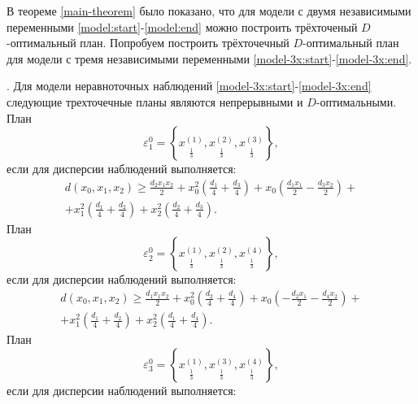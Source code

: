 В теореме \ref{main-theorem} было показано, что для модели с двумя независимыми переменными \eqref{model:start}-\eqref{model:end} можно построить трёхточеный $D$-оптимальный план.  
Попробуем построить трёхточечный $D$-оптимальный план для модели с тремя независимыми переменными  \eqref{model-3x:start}-\eqref{model-3x:end}.
\begin{theorem}.\label{theorem:model-3x-D-opt}
	Для модели неравноточных наблюдений \eqref{model-3x:start}-\eqref{model-3x:end} следующие трехточечные планы являются непрерывными и $D$-оптимальными.\\
	План 
	\begin{equation} \label{theorem:model-3x-D-opt:plan-1}
	\varepsilon_1^{0} = \left \{ 
	\underset{\frac 1 3} {x^{(1)}},
	\underset{\frac 1 3} {x^{(2)}},
	\underset{\frac 1 3} {x^{(3)}}
	\right \},
	\end{equation}
	если для дисперсии наблюдений выполняется:
	\begin{multline}\label{theorem:model-3x-D-opt:plan-1-d}
	d(x_0, x_1, x_2) \ge \frac{d_{2} x_{1} x_{2}}{2} + x_{0}^{2} \left(\frac{d_{1}}{4} + \frac{d_{3}}{4}\right) + x_{0} \left(\frac{d_{1} x_{1}}{2} - \frac{d_{3} x_{2}}{2}\right) + \\ + x_{1}^{2} \left(\frac{d_{1}}{4} + \frac{d_{2}}{4}\right) + x_{2}^{2} \left(\frac{d_{2}}{4} + \frac{d_{3}}{4}\right).
	\end{multline}
	План 
	\begin{equation} \label{theorem:model-3x-D-opt:plan-2}
	\varepsilon_2^{0} = \left \{ 
	\underset{\frac 1 3} {x^{(1)}},
	\underset{\frac 1 3} {x^{(2)}},
	\underset{\frac 1 3} {x^{(4)}}
	\right \},
	\end{equation}
	если для дисперсии наблюдений выполняется:
	\begin{multline}\label{theorem:model-3x-D-opt:plan-2-d}
	d(x_0, x_1, x_2) \ge \frac{d_{1} x_{1} x_{2}}{2} + x_{0}^{2} \left(\frac{d_{2}}{4} + \frac{d_{4}}{4}\right) + x_{0} \left(- \frac{d_{2} x_{1}}{2} - \frac{d_{4} x_{2}}{2}\right) + \\ + x_{1}^{2} \left(\frac{d_{1}}{4} + \frac{d_{2}}{4}\right) + x_{2}^{2} \left(\frac{d_{1}}{4} + \frac{d_{4}}{4}\right).
	\end{multline}
	План 
	\begin{equation} \label{theorem:model-3x-D-opt:plan-3}
	\varepsilon_3^{0} = \left \{ 
	\underset{\frac 1 3} {x^{(1)}},
	\underset{\frac 1 3} {x^{(3)}},
	\underset{\frac 1 3} {x^{(4)}}
	\right \},
	\end{equation}
	если для дисперсии наблюдений выполняется:

\end{theorem}
